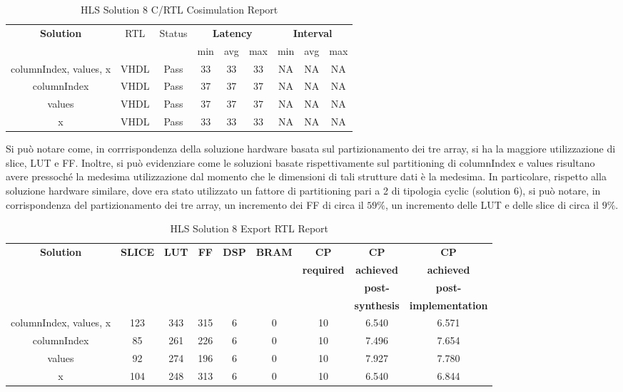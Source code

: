 \begin{table}[H]
	\centering
	\begin{tabular}{|c|c|c|c|c|c|c|c|c|}
		\hline
		\multicolumn{1}{|c|}{\textbf{Solution}} & \multicolumn{1}{|c|}{RTL} & \multicolumn{1}{|c|}{Status} & \multicolumn{3}{c|}{\textbf{Latency}} & \multicolumn{3}{c|}{\textbf{Interval}} \\
		& &  & min & avg & max & min & avg & max \\
		\hline
		columnIndex, values, x & VHDL & Pass & 33 & 33 & 33 & NA & NA & NA \\
		\hline
		columnIndex & VHDL & Pass & 37 & 37 & 37 & NA & NA & NA \\
		\hline
		values & VHDL & Pass & 37 & 37 & 37 & NA & NA & NA \\
		\hline
		x & VHDL & Pass & 33 & 33 & 33 & NA & NA & NA \\
		\hline
	\end{tabular}
	\caption{HLS Solution 8 C/RTL Cosimulation Report }
	\label{tab:hls-solution-8-cosimulation-report}
\end{table}

Si può notare come, in corrrispondenza della soluzione hardware basata sul partizionamento dei tre array, si ha la maggiore utilizzazione di slice, LUT e FF. Inoltre, si può evidenziare come le soluzioni basate rispettivamente sul partitioning di columnIndex e values risultano avere pressoché la medesima utilizzazione dal momento che le dimensioni di tali strutture dati è la medesima. In particolare, rispetto alla soluzione hardware similare, dove era stato utilizzato un fattore di partitioning pari a 2 di tipologia cyclic (solution 6), si può notare, in corrispondenza del partizionamento dei tre array, un incremento dei FF di circa il $59\%$, un incremento delle LUT e delle slice di circa il $9\%$.

\begin{table}[H]
	\centering
	\begin{tabular}{|c|c|c|c|c|c|c|c|c|}
		\hline
		\textbf{Solution} & \textbf{SLICE} & \textbf{LUT} & \textbf{FF} & \textbf{DSP} & \textbf{BRAM} & \textbf{CP} & \textbf{CP} & \textbf{CP} \\
		& & & & & & \textbf{required} & \textbf{achieved} & \textbf{achieved}\\
		& & & & & & & \textbf{post-} & \textbf{post-}\\
		& & & & & & & \textbf{synthesis} & \textbf{implementation}\\
		\hline
		columnIndex, values, x  & 123 & 343 & 315 & 6 & 0 & 10 & 6.540 & 6.571 \\
		\hline
		columnIndex  & 85 & 261 & 226 & 6 & 0 & 10 & 7.496 & 7.654 \\
		\hline
		values  & 92 & 274 & 196 & 6 & 0 & 10 & 7.927 & 7.780 \\
		\hline
		x  & 104 & 248 & 313 & 6 & 0 & 10 & 6.540 & 6.844 \\
		\hline
	\end{tabular}
	\caption{HLS Solution 8 Export RTL Report}
	\label{tab:hls-solution-8-export-rtl-report}
\end{table}
